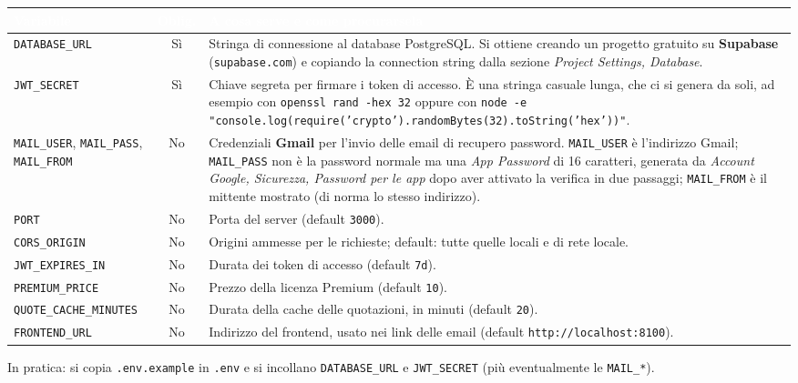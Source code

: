 \begin{table}[H]
\centering
{}
\renewcommand{\arraystretch}{1.3}
\begin{tabularx}{\textwidth}{|l|c|X|}
\hline
\rowcolor[HTML]{3B3766}
\textcolor{white}{\textbf{Variabile}} & \textcolor{white}{\textbf{Oblig.}} & \textcolor{white}{\textbf{A cosa serve e come procurarsela}} \\ \hline
\texttt{DATABASE\_URL} & Sì & Stringa di connessione al database PostgreSQL. Si ottiene creando un progetto gratuito su \textbf{Supabase} (\texttt{supabase.com}) e copiando la connection string dalla sezione \textit{Project Settings, Database}. \\ \hline
\texttt{JWT\_SECRET} & Sì & Chiave segreta per firmare i token di accesso. È una stringa casuale lunga, che ci si genera da soli, ad esempio con \texttt{openssl rand -hex 32} oppure con \texttt{node -e "console.log(require('crypto').randomBytes(32).toString('hex'))"}. \\ \hline
\texttt{MAIL\_USER}, \texttt{MAIL\_PASS}, \texttt{MAIL\_FROM} & No & Credenziali \textbf{Gmail} per l'invio delle email di recupero password. \texttt{MAIL\_USER} è l'indirizzo Gmail; \texttt{MAIL\_PASS} non è la password normale ma una \textit{App Password} di 16 caratteri, generata da \textit{Account Google, Sicurezza, Password per le app} dopo aver attivato la verifica in due passaggi; \texttt{MAIL\_FROM} è il mittente mostrato (di norma lo stesso indirizzo). \\ \hline
\texttt{PORT} & No & Porta del server (default \texttt{3000}). \\ \hline
\texttt{CORS\_ORIGIN} & No & Origini ammesse per le richieste; default: tutte quelle locali e di rete locale. \\ \hline
\texttt{JWT\_EXPIRES\_IN} & No & Durata dei token di accesso (default \texttt{7d}). \\ \hline
\texttt{PREMIUM\_PRICE} & No & Prezzo della licenza Premium (default \texttt{10}). \\ \hline
\texttt{QUOTE\_CACHE\_MINUTES} & No & Durata della cache delle quotazioni, in minuti (default \texttt{20}). \\ \hline
\texttt{FRONTEND\_URL} & No & Indirizzo del frontend, usato nei link delle email (default \texttt{http://localhost:8100}). \\ \hline
\end{tabularx}
\end{table}

In pratica: si copia \texttt{.env.example} in \texttt{.env} e si incollano \texttt{DATABASE\_URL} e \texttt{JWT\_SECRET} (più eventualmente le \texttt{MAIL\_*}).

